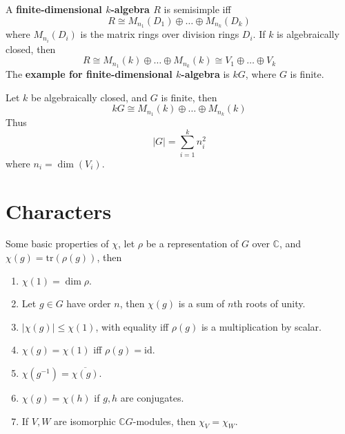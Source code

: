 \documentclass[openany]{book}
\newcommand{\tr}{\text{tr}}
\newcommand{\C}{\mathbb{C}}
\begin{document}
\begin{prop}
    A \textbf{finite-dimensional $k$-algebra $R$} is semisimple iff 
    \begin{equation*}
        R\cong M_{n_1}(D_1)\oplus\dots\oplus M_{n_k}(D_k)
    \end{equation*}
    where $M_{n_i}(D_i)$ is the matrix rings over division rings $D_i$. If $k$ is algebraically closed, then 
    \begin{equation*}
        R\cong M_{n_1}(k)\oplus\dots\oplus M_{n_k}(k)\cong V_1\oplus\dots\oplus V_k
    \end{equation*}
    The \textbf{example for finite-dimensional $k$-algebra} is $kG$, where $G$ is finite.
\end{prop}

\begin{prop}
    Let $k$ be algebraically closed, and $G$ is finite, then 
    \begin{equation*}
        kG\cong M_{n_1}(k)\oplus\dots\oplus M_{n_k}(k)
    \end{equation*}
    Thus 
    \begin{equation*}
        |G|=\sum_{i=1}^kn_i^2
    \end{equation*}
    where $n_i=\dim(V_i)$.
\end{prop}


\section{Characters}


\begin{prop}
    Some basic properties of $\chi$, let $\rho$ be a representation of $G$ over $\C$, and $\chi(g)=\tr(\rho(g))$, then 
    \begin{enumerate}
        \item $\chi(1)=\dim\rho$.
        \item Let $g\in G$ have order $n$, then $\chi(g)$ is a sum of $n$th roots of unity.
        \item $|\chi(g)|\leq\chi(1)$, with equality iff $\rho(g)$ is a multiplication by scalar.
        \item $\chi(g)=\chi(1)$ iff $\rho(g)=\text{id}$.
        \item $\chi(g^{-1})=\overline{\chi(g)}$.
        \item $\chi(g)=\chi(h)$ if $g,h$ are conjugates.
        \item If $V,W$ are isomorphic $\C G$-modules, then $\chi_V=\chi_W$.
    \end{enumerate}
\end{prop}
\end{document}
